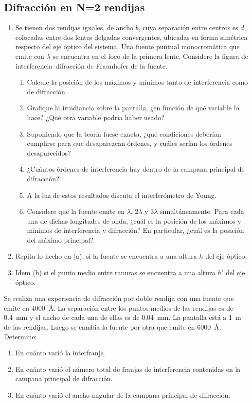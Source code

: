 \subsection*{Difracción en N=2 rendijas}

\item 
\begin{enumerate}
	\item Se tienen dos rendijas iguales, de ancho $b$, cuya separación entre centros es $d$, colocadas entre dos lentes delgadas convergentes, ubicadas en forma simétrica respecto del eje óptico del sistema.
	Una fuente puntual monocromática que emite con $\lambda$ se encuentra en el foco de la primera lente. Considere la figura de interferencia--difracción de Fraunhofer de la fuente. 
	\begin{enumerate}
		\item Calcule la posición de los máximos y mínimos tanto de interferencia como de difracción. 
		\item Grafique la irradiancia sobre la pantalla, ¿en función de qué variable lo hace?
		¿Qué otra variable podría haber usado?
		\item Suponiendo que la teoría fuese exacta, ¿qué condiciones deberían cumplirse para que desaparezcan órdenes, y cuáles serían los órdenes desaparecidos? 
		\item ¿Cuántos órdenes de interferencia hay dentro de la campana principal de difracción?
		\item A la luz de estos resultados discuta el interferómetro de Young. 
		\item Considere que la fuente emite en $\lambda$, $2\lambda$ y $3\lambda$ simultáneamente.
		Para cada una de dichas longitudes de onda, ¿cuál es la posición de los máximos y mínimos de interferencia y difracción?
		En particular, ¿cuál es la posición del máximo principal?
	\end{enumerate}
	\item Repita lo hecho en (a), si la fuente se encuentra a una altura $h$ del eje óptico. 
	\item Idem (b) si el punto medio entre ranuras se encuentra a una altura $h'$ del eje óptico. 
\end{enumerate}


\item Se realiza una experiencia de difracción por doble rendija con una fuente que emite en \SI{4000}{\angstrom}.
La separación entre los puntos medios de las rendijas es de \SI{0.4}{\milli\metre} y el ancho de cada una de ellas es de \SI{0.04}{\milli\metre}.
La pantalla está a \SI{1}{\metre} de las rendijas.
Luego se cambia la fuente por otra que emite en \SI{6000}{\angstrom}.
Determine:
\begin{enumerate}
	\item En cuánto varió la interfranja. 
	\item En cuánto varió el número total de franjas de interferencia contenidas en la campana principal de difracción. 
	\item En cuánto varió el ancho angular de la campana principal de difracción. 
\end{enumerate}



